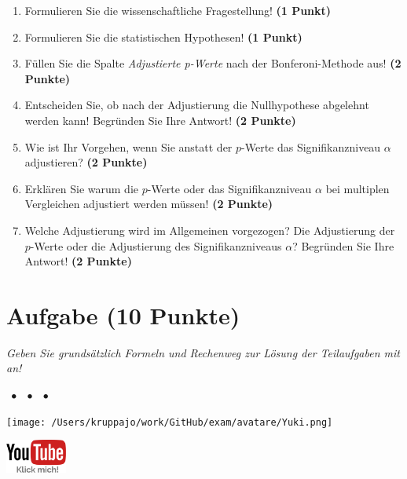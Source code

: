 \documentclass[a4paper, 9pt]{scrartcl}\usepackage[]{graphicx}\usepackage[]{xcolor}
\begin{document}
\begin{enumerate}
  \item Formulieren Sie die wissenschaftliche Fragestellung! \textbf{(1 Punkt)}
  \item Formulieren Sie die statistischen Hypothesen! \textbf{(1 Punkt)}
\item Füllen Sie die Spalte \textit{Adjustierte p-Werte} nach der Bonferoni-Methode aus! \textbf{(2 Punkte)}
\item Entscheiden Sie, ob nach der Adjustierung die Nullhypothese abgelehnt werden kann! Begründen Sie Ihre Antwort! \textbf{(2 Punkte)}
\item Wie ist Ihr Vorgehen, wenn Sie anstatt der $p$-Werte das Signifikanzniveau $\alpha$ adjustieren? \textbf{(2 Punkte)}
\item Erklären Sie warum die $p$-Werte oder das Signifikanzniveau $\alpha$ bei multiplen Vergleichen adjustiert werden müssen! \textbf{(2 Punkte)}
\item Welche Adjustierung wird im Allgemeinen vorgezogen? Die Adjustierung der $p$-Werte oder die Adjustierung des Signifikanzniveaus $\alpha$? Begründen Sie Ihre Antwort! \textbf{(2 Punkte)}
\end{enumerate}


 
\clearpage

\section{Aufgabe \hfill (10 Punkte)}

\textit{Geben Sie grundsätzlich Formeln und Rechenweg zur Lösung der Teilaufgaben mit an!} \\[1Ex]
 

 
\ifcollection
\begin{flushright}
\tiny\vspace{-3Ex}
\textbf{\examinhaltstart}
\exammodulestat $\;\bullet$
\exammodulestatbbv $\;\bullet$
\exammodulestatversuch $\;\bullet$
\exammodulebiostat
\vspace{-4Ex}
\end{flushright}
\begin{minipage}[t]{0.5\textwidth}
\texttt{[image: /Users/kruppajo/work/GitHub/exam/avatare/Yuki.png]}
\end{minipage}
\begin{minipage}[t]{0.5\textwidth}
\hfill
\href{https://youtu.be/VNz7nDuK148}{\includegraphics[width = 2cm]{img/youtube}}
\end{minipage}
\vspace{-3ex}
\fi
\end{document}
